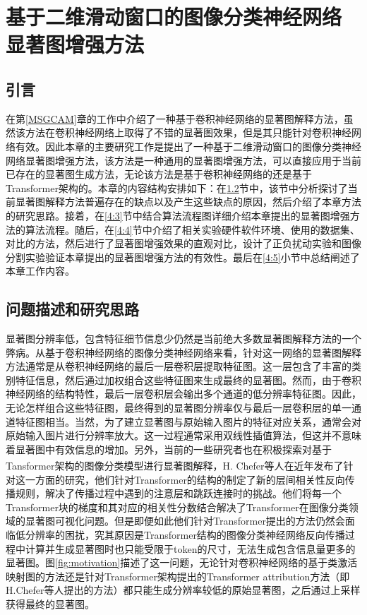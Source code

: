 




\chapter[基于二维滑动窗口的图像分类神经网络显著图增强方法]{\texorpdfstring{基于二维滑动窗口的图像分类神经网络\\显著图增强方法}{基于二维滑动窗口的图像分类神经网络显著图增强方法}}

\thispagestyle{others}
\pagestyle{others}
\xiaosi

\section{引言}
在第\ref{MSGCAM}章的工作中介绍了一种基于卷积神经网络的显著图解释方法，虽然该方法在卷积神经网络上取得了不错的显著图效果，但是其只能针对卷积神经网络有效。因此本章的主要研究工作是提出了一种基于二维滑动窗口的图像分类神经网络显著图增强方法，该方法是一种通用的显著图增强方法，可以直接应用于当前已存在的显著图生成方法，无论该方法是基于卷积神经网络的还是基于Transformer架构的。本章的内容结构安排如下：在\ref{4:2}节中，该节中分析探讨了当前显著图解释方法普遍存在的缺点以及产生这些缺点的原因，然后介绍了本章方法的研究思路。接着，在\ref{4:3}节中结合算法流程图详细介绍本章提出的显著图增强方法的算法流程。随后，在\ref{4:4}节中介绍了相关实验硬件软件环境、使用的数据集、对比的方法，然后进行了显著图增强效果的直观对比，设计了正负扰动实验和图像分割实验验证本章提出的显著图增强方法的有效性。最后在\ref{4:5}小节中总结阐述了本章工作内容。


\section{问题描述和研究思路}\label{4:2}

显著图分辨率低，包含特征细节信息少仍然是当前绝大多数显著图解释方法的一个弊病。从基于卷积神经网络的图像分类神经网络来看，针对这一网络的显著图解释方法通常是从卷积神经网络的最后一层卷积层提取特征图。这一层包含了丰富的类别特征信息，然后通过加权组合这些特征图来生成最终的显著图。然而，由于卷积神经网络的结构特性，最后一层卷积层会输出多个通道的低分辨率特征图。因此，无论怎样组合这些特征图，最终得到的显著图分辨率仅与最后一层卷积层的单一通道特征图相当。当然，为了建立显著图与原始输入图片的特征对应关系，通常会对原始输入图片进行分辨率放大。这一过程通常采用双线性插值算法，但这并不意味着显著图中有效信息的增加。另外，当前的一些研究者也在积极探索对基于Tansformer架构的图像分类模型进行显著图解释，H. Chefer等人\textsuperscript{\cite{chefer2021transformer}}在近年发布了针对这一方面的研究，他们针对Transformer的结构的制定了新的层间相关性反向传播规则，解决了传播过程中遇到的注意层和跳跃连接时的挑战。他们将每一个Transformer块的梯度和其对应的相关性分数结合解决了Transformer在图像分类领域的显著图可视化问题。但是即便如此他们针对Transformer提出的方法仍然会面临低分辨率的困扰，究其原因是Transformer结构的图像分类神经网络反向传播过程中计算并生成显著图时也只能受限于token的尺寸，无法生成包含信息量更多的显著图。图\ref{fig:motivation}描述了这一问题，无论针对卷积神经网络的基于类激活映射图的方法还是针对Transformer架构提出的Transformer attribution方法（即H.Chefer等人提出的方法）都只能生成分辨率较低的原始显著图，之后通过上采样获得最终的显著图。


